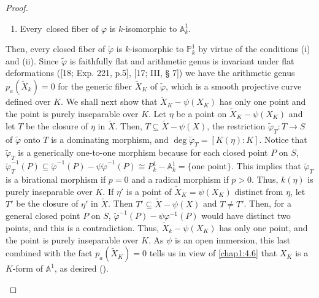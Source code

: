 \begin{proof}
\begin{enumerate}
\begin{enumerate}
\item Every\pageoriginale\ closed fiber of $\varphi$ is $k$-isomorphic
  to $\mathbb{A}^{1}_{k}$.
\end{enumerate}
Then, every closed fiber of $\widetilde{\varphi}$ is $k$-isomorphic to
$\mathbb{P}^{1}_{k}$ by virtue of the conditions (i) and (ii). Since
$\widetilde{\varphi}$ is faithfully flat and arithmetic genus is
invariant under flat deformations ([18; Exp. 221, p.5], [17; III, \S
  7]) we have the arithmetic genus $p_{a}(\widetilde{X}_{k})=0$ for
the generic fiber $\widetilde{X}_{K}$ of $\widetilde{\varphi}$, which
is a smooth projective curve defined over $K$. We shall next show that
$\widetilde{X}_{K}-\psi(X_{K})$ has only one point and the point is
purely inseparable over $K$. Let $\eta$ be a point on
$\widetilde{X}_{K}-\psi(X_{K})$ and let $T$ be the closure of $\eta$
in $\widetilde{X}$. Then, $T\subseteq \widetilde{X}-\psi(X)$, the
restriction $\widetilde{\varphi}_{T}:T\to S$ of $\widetilde{\varphi}$
onto $T$ is a dominating morphism, and $\deg
\widetilde{\varphi}_{T}=[K(\eta):K]$. Notice that
$\widetilde{\varphi}_{T}$ is a generically one-to-one morphism because
for each closed point $P$ on $S$,
$\widetilde{\varphi}^{-1}_{T}(P)\subseteq
\widetilde{\varphi}^{-1}(P)-\psi\widetilde{\varphi}^{-1}(P)\cong
P^{1}_{k}-\mathbb{A}^{1}_{k}=\{\text{one point}\}$. This implies that
$\widetilde{\varphi}_{T}$ is a birational morphism if $p=0$ and a
radical morphism if $p>0$. Thus, $k(\eta)$ is purely inseparable over
$K$. If $\eta'$ is a point of $\widetilde{X}_{K}=\psi(X_{K})$ distinct
from $\eta$, let $T'$ be the closure of $\eta'$ in
$\widetilde{X}$. Then $T'\subseteq \widetilde{X}-\psi(X)$ and $T\neq
T'$. Then, for a general closed point $P$ on $S$,
$\widetilde{\varphi}^{-1}(P)-\psi\varphi^{-1}(P)$ would have distinct
two points, and this is a contradiction. Thus,
$\widetilde{X}_{k}-\psi(X_{K})$ has only one point, and the point is
purely inseparable over $K$. As $\psi$ is an open immersion, this last
combined with the fact $p_{a}(\widetilde{X}_{K})=0$ tells us in view
of \ref{chap1:4.6} that $X_{K}$ is a $K$-form of $\mathbb{A}^{1}$, as
desired (\cf [26: 6.7.7]).
\end{enumerate}
\end{proof}

\subsection{}\label{chap1:4.8}

